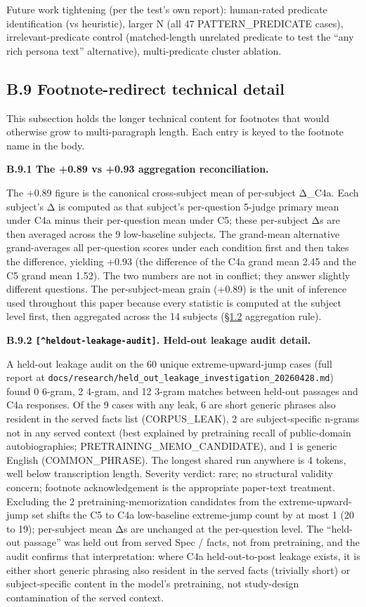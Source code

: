 Future work tightening (per the test's own report): human-rated
predicate identification (vs heuristic), larger N (all 47
PATTERN\_PREDICATE cases), irrelevant-predicate control (matched-length
unrelated predicate to test the ``any rich persona text'' alternative),
multi-predicate cluster ablation.

\hypertarget{b.9-footnote-redirect-technical-detail}{%
\subsection{B.9 Footnote-redirect technical
detail}\label{b.9-footnote-redirect-technical-detail}}

This subsection holds the longer technical content for footnotes that
would otherwise grow to multi-paragraph length. Each entry is keyed to
the footnote name in the body.

\textbf{B.9.1 The +0.89 vs +0.93 aggregation reconciliation.}

The +0.89 figure is the canonical cross-subject mean of per-subject
Δ\_C4a. Each subject's Δ is computed as that subject's per-question
5-judge primary mean under C4a minus their per-question mean under C5;
these per-subject Δs are then averaged across the 9 low-baseline
subjects. The grand-mean alternative grand-averages all per-question
scores under each condition first and then takes the difference,
yielding +0.93 (the difference of the C4a grand mean 2.45 and the C5
grand mean 1.52). The two numbers are not in conflict; they answer
slightly different questions. The per-subject-mean grain (+0.89) is the
unit of inference used throughout this paper because every statistic is
computed at the subject level first, then aggregated across the 14
subjects (\hyperref[what-we-tested]{§1.2} aggregation rule).

\textbf{B.9.2 \texttt{{[}\^{}heldout-leakage-audit{]}}. Held-out leakage
audit detail.}

A held-out leakage audit on the 60 unique extreme-upward-jump cases
(full report at
\texttt{docs/research/held\_out\_leakage\_investigation\_20260428.md})
found 0 6-gram, 2 4-gram, and 12 3-gram matches between held-out
passages and C4a responses. Of the 9 cases with any leak, 6 are short
generic phrases also resident in the served facts list (CORPUS\_LEAK), 2
are subject-specific n-grams not in any served context (best explained
by pretraining recall of public-domain autobiographies;
PRETRAINING\_MEMO\_CANDIDATE), and 1 is generic English
(COMMON\_PHRASE). The longest shared run anywhere is 4 tokens, well
below transcription length. Severity verdict: rare; no structural
validity concern; footnote acknowledgement is the appropriate paper-text
treatment. Excluding the 2 pretraining-memorization candidates from the
extreme-upward-jump set shifts the C5 to C4a low-baseline extreme-jump
count by at most 1 (20 to 19); per-subject mean Δs are unchanged at the
per-question level. The ``held-out passage'' was held out from served
Spec / facts, not from pretraining, and the audit confirms that
interpretation: where C4a held-out-to-post leakage exists, it is either
short generic phrasing also resident in the served facts (trivially
short) or subject-specific content in the model's pretraining, not
study-design contamination of the served context.

